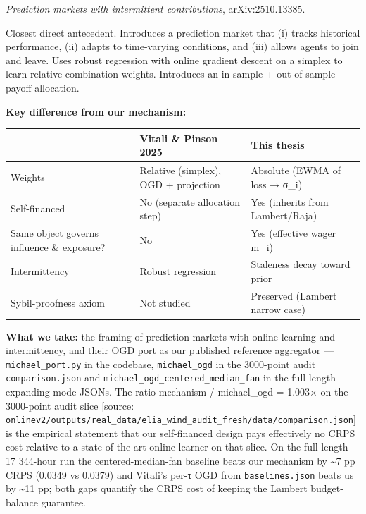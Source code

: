\documentclass[11pt,a4paper,openany]{report}
\begin{document}
\emph{Prediction markets with intermittent contributions}, arXiv:2510.13385.

Closest direct antecedent. Introduces a prediction market that (i) tracks
historical performance, (ii) adapts to time-varying conditions, and
(iii) allows agents to join and leave. Uses robust regression with
online gradient descent on a simplex to learn relative combination
weights. Introduces an in-sample + out-of-sample payoff allocation.

\textbf{Key difference from our mechanism:}

\begin{center}
\small
\begin{tabular}{lll}
\toprule
\textbf{} & \textbf{Vitali \& Pinson 2025} & \textbf{This thesis} \\
\midrule
Weights & Relative (simplex), OGD + projection & Absolute (EWMA of loss → σ\_i) \\
Self-financed & No (separate allocation step) & Yes (inherits from Lambert/Raja) \\
Same object governs influence \& exposure? & No & Yes (effective wager m\_i) \\
Intermittency & Robust regression & Staleness decay toward prior \\
Sybil-proofness axiom & Not studied & Preserved (Lambert narrow case) \\
\bottomrule
\end{tabular}
\end{center}

\textbf{What we take:} the framing of prediction markets with online learning
and intermittency, and their OGD port as our published reference
aggregator — \texttt{michael\_port.py} in the codebase, \texttt{michael\_ogd} in the
3000-point audit \texttt{comparison.json} and
\texttt{michael\_ogd\_centered\_median\_fan} in the full-length expanding-mode
JSONs. The ratio mechanism / michael\_ogd = 1.003× on the 3000-point
audit slice [source:
\texttt{onlinev2/outputs/real\_data/elia\_wind\_audit\_fresh/data/comparison.json}]
is the empirical statement that our self-financed design pays
effectively no CRPS cost relative to a state-of-the-art online learner
on that slice. On the full-length 17 344-hour run the
centered-median-fan baseline beats our mechanism by \textasciitilde{}7 pp CRPS (0.0349
vs 0.0379) and Vitali's per-τ OGD from \texttt{baselines.json} beats us by
\textasciitilde{}11 pp; both gaps quantify the CRPS cost of keeping the Lambert
budget-balance guarantee.
\end{document}
